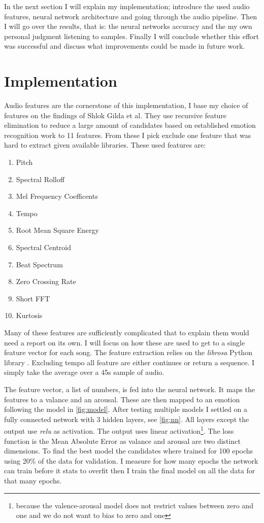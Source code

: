 \documentclass[lang=en, hanging-titles=true]{skrapport}
\begin{document}
In the next section I will explain my implementation; introduce the used audio features, neural network architecture and going through the audio pipeline. Then I will go over the results, that is: the neural networks accuracy and the my own personal judgment listening to samples. Finally I will conclude whether this effort was successful and discuss what improvements could be made in future work.

\section{Implementation}
Audio features are the cornerstone of this implementation, I base my choice of features on the findings of Shlok Gilda et al\cite{features}. They use recursive feature elimination to reduce a large amount of candidates based on established emotion recognition work to 11 features. From these I pick exclude one feature that was hard to extract given available libraries. These used features are:

\begin{multicols}{2}
\begin{enumerate}
	\item Pitch
	\item Spectral Rolloff
	\item Mel Frequency Coefficents
	\item Tempo
	\item Root Mean Square Energy
	\item Spectral Centroid
	\item Beat Spectrum
	\item Zero Crossing Rate
	\item Short FFT
	\item Kurtosis
\end{enumerate}
\end{multicols}

Many of these features are sufficiently complicated that to explain them would need a report on its own. I will focus on how these are used to get to a single feature vector for each song. The feature extraction relies on the \textit{librosa} Python library \cite{librosa}. Excluding tempo all feature are either continues or return a sequence. I simply take the average over a 45s sample of audio. 

The feature vector, a list of numbers, is fed into the neural network. It maps the features to a valance and an arousal. These are then mapped to an emotion following the model in \cref{fig:model}. After testing multiple models I settled on a fully connected network with 3 hidden layers, see \cref{fig:nn}. All layers except the output use \textit{relu} as activation. The output uses linear activation\footnote{because the valence-arousal model does not restrict values between zero and one and we do not want to bias to zero and one}. The loss function is the Mean Absolute Error as valance and arousal are two distinct dimensions. To find the best model the candidates where trained for 100 epochs using 20\% of the data for validation. I measure for how many epochs the network can train before it stats to overfit then I train the final model on all the data for that many epochs.
\end{document}
